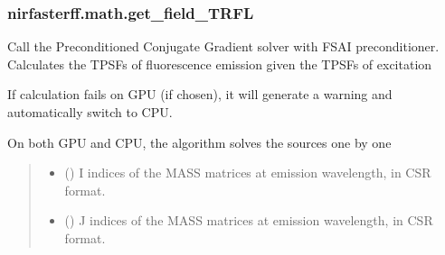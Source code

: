 \documentclass[letterpaper,10pt,english]{sphinxmanual}
\begin{document}
\sphinxstepscope


\subsubsection{nirfasterff.math.get\_field\_TRFL}
\label{\detokenize{_autosummary/nirfasterff.math.get_field_TRFL:nirfasterff-math-get-field-trfl}}\label{\detokenize{_autosummary/nirfasterff.math.get_field_TRFL::doc}}

\begin{fulllineitems}
\label{\detokenize{_autosummary/nirfasterff.math.get_field_TRFL:nirfasterff.math.get_field_TRFL}}
\pysigstartsignatures
{}
\pysigstopsignatures
\sphinxAtStartPar
Call the Preconditioned Conjugate Gradient solver with FSAI preconditioner. Calculates the TPSFs of fluorescence emission given the TPSFs of excitation

\sphinxAtStartPar
If calculation fails on GPU (if chosen), it will generate a warning and automatically switch to CPU.

\sphinxAtStartPar
On both GPU and CPU, the algorithm solves the sources one by one
\begin{quote}\begin{description}
\begin{itemize}
\item {} 
\sphinxAtStartPar
{} (\sphinxstyleliteralemphasis{\sphinxupquote{, }}) \textendash{} I indices of the MASS matrices at emission wavelength, in CSR format.

\item {} 
\sphinxAtStartPar
{} (\sphinxstyleliteralemphasis{\sphinxupquote{, }}) \textendash{} J indices of the MASS matrices at emission wavelength, in CSR format.


\end{itemize}
\end{description}
\end{quote}
\end{fulllineitems}
\end{document}
